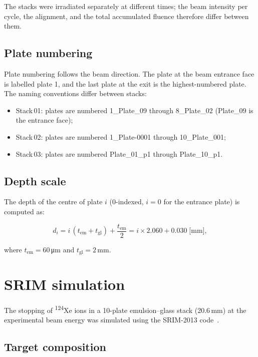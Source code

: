 \documentclass[12pt,a4paper]{article}
\begin{document}
The stacks were irradiated separately at different times; the beam
intensity per cycle, the alignment, and the total accumulated fluence
therefore differ between them.

\subsection{Plate numbering}

Plate numbering follows the beam direction. The plate at the beam
entrance face is labelled plate 1, and the last plate at the exit is
the highest-numbered plate. The naming conventions differ between
stacks:
\begin{itemize}
  \item Stack\,01: plates are numbered 1\_Plate\_09 through
        8\_Plate\_02 (Plate\_09 is the entrance face);
  \item Stack\,02: plates are numbered 1\_Plate-0001 through
        10\_Plate\_001;
  \item Stack\,03: plates are numbered Plate\_01\_p1 through
        Plate\_10\_p1.
\end{itemize}

\subsection{Depth scale}

The depth of the centre of plate $i$ (0-indexed, $i=0$ for the
entrance plate) is computed as:

\[
d_i = i\,(t_{\text{em}} + t_{\text{gl}}) + \frac{t_{\text{em}}}{2}
     = i \times 2.060 + 0.030 \;\text{[mm]},
\]

where $t_{\text{em}} = 60$\,\si{\micro\meter} and
$t_{\text{gl}} = 2$\,mm.

\section{SRIM simulation }
\label{sec:srim}

The stopping of \textsuperscript{124}Xe ions in a 10-plate
emulsion--glass stack (20.6\,mm) at the experimental beam energy was
simulated using the SRIM-2013 code~\cite{srim2008}.

\subsection{Target composition}
\end{document}
